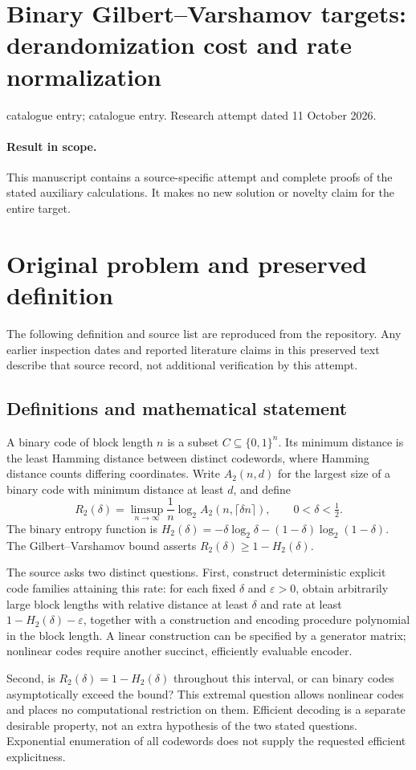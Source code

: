 \documentclass[11pt]{article}
\begin{document}
\section*{Binary Gilbert--Varshamov targets: derandomization cost and rate normalization}
\noindent catalogue entry; catalogue entry. Research attempt dated 11 October 2026.
\paragraph{Result in scope.}This manuscript contains a source-specific attempt and complete proofs of the stated auxiliary calculations. It makes no new solution or novelty claim for the entire target.
\section{Original problem and preserved definition}
The following definition and source list are reproduced from the repository. Any earlier inspection dates and reported literature claims in this preserved text describe that source record, not additional verification by this attempt.
\subsection{Definitions and mathematical statement}
A binary code of block length $n$ is a subset $C\subseteq\{0,1\}^n$.
Its minimum distance is the least Hamming distance between distinct
codewords, where Hamming distance counts differing coordinates.
Write $A_2(n,d)$ for the largest size of a binary code with minimum
distance at least $d$, and define
\[
 R_2(\delta)=\limsup_{n\to\infty}
            \frac1n\log_2 A_2(n,\lceil\delta n\rceil),
 \qquad 0<\delta<\tfrac12.
\]
The binary entropy function is
$H_2(\delta)=-\delta\log_2\delta-(1-\delta)\log_2(1-\delta)$.
The Gilbert--Varshamov bound asserts $R_2(\delta)\ge1-H_2(\delta)$.

The source asks two distinct questions. First, construct deterministic
explicit code families attaining this rate: for each fixed $\delta$
and $\varepsilon>0$, obtain arbitrarily large block lengths with
relative distance at least $\delta$ and rate at least
$1-H_2(\delta)-\varepsilon$, together with a construction and encoding
procedure polynomial in the block length. A linear construction can
be specified by a generator matrix; nonlinear codes require another
succinct, efficiently evaluable encoder.

Second, is $R_2(\delta)=1-H_2(\delta)$ throughout this interval, or can
binary codes asymptotically exceed the bound? This extremal question
allows nonlinear codes and places no computational restriction on
them. Efficient decoding is a separate desirable property, not an
extra hypothesis of the two stated questions. Exponential enumeration
of all codewords does not supply the requested efficient explicitness.
\end{document}
